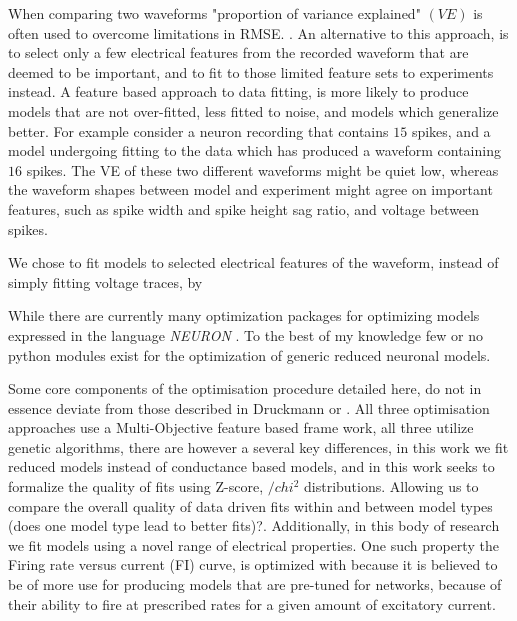 When comparing two waveforms "proportion of variance explained" $(VE)$ is often used to overcome limitations in RMSE. \cite{schoppe2016measuring}. An alternative to this approach, is to select only a few electrical features from the recorded waveform that are deemed to be important, and to fit to those limited feature sets to experiments instead. A feature based approach to data fitting, is more likely to produce models that are not over-fitted, less fitted to noise, and models which generalize better. For example consider a neuron recording that contains $15$ spikes, and a model undergoing fitting to the data which has produced a waveform containing $16$ spikes. The VE of these two different waveforms might be quiet low, whereas the waveform shapes between model and experiment might agree on important features, such as spike width and spike height sag ratio, and voltage between spikes.


We chose to fit models to selected electrical features of the waveform, instead of simply fitting voltage traces, by 


While there are currently many optimization packages for optimizing models expressed in the language \emph{NEURON} \cite{friedrich2014flexible} \cite{bluepyopt} \cite{neurotune}. To the best of my knowledge few or no python modules exist for the optimization of generic reduced neuronal models.

Some core components of the optimisation procedure detailed here, do not in essence deviate from those described in Druckmann \cite{druckmann2008evaluating} or \cite{bluepyopt}. All three optimisation approaches use a Multi-Objective feature based frame work, all three utilize genetic algorithms, there are however a several key differences, in this work we fit reduced models instead of conductance based models, and in this work seeks to formalize the quality of fits using Z-score, $/chi^{2}$ distributions. Allowing us to compare the overall quality of data driven fits within and between model types (does one model type lead to better fits)?. Additionally, in this body of research we fit models using a novel range of electrical properties. One such property the Firing rate versus current (FI) curve, is optimized with because it is believed to be of more use for producing models that are pre-tuned for networks, because of their ability to fire at prescribed rates for a given amount of excitatory current.